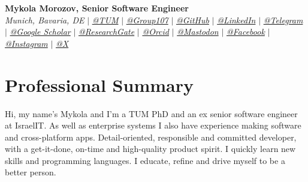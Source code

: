\documentclass[letterpaper,10pt]{article}
\newcommand{\sectionspace}{
\vspace{-20pt}
}
\begin{document}
	

\begin{flushleft}
    \textbf{\large Mykola Morozov, Senior Software Engineer} \\    
    \textit{Munich, Bavaria, DE} $|$ 
    \href{mailto:mykola.morozov@tum.de}{{\textit{@TUM}}} $|$
    \href{mailto:mykola@group107.com}{{\textit{@Group107}}} $|$
    \href{https://github.com/mcmikecreations}{{\textit{@GitHub}}} $|$
    \href{https://www.linkedin.com/in/mykola-mor}{{\textit{@LinkedIn}}} $|$
    \href{https://t.me/mcmikecreations}{{\textit{@Telegram}}} $|$
    \href{https://scholar.google.com/citations?user=MwdhZtkAAAAJ&hl=en}{{\textit{@Google Scholar}}} $|$
    \href{https://www.researchgate.net/profile/Mykola_Morozov3}{{\textit{@ResearchGate}}} $|$
    \href{https://orcid.org/0000-0002-5892-6936}{{\textit{@Orcid}}} $|$
    \href{https://mastodon.social/@mykolamor}{{\textit{@Mastodon}}} $|$
    \href{https://www.facebook.com/mykolamor}{{\textit{@Facebook}}} $|$
    \href{https://www.instagram.com/mykolamor}{{\textit{@Instagram}}} $|$
    \href{https://twitter.com/MykolaMor}{{\textit{@X}}}
    \vspace{-8pt}
\end{flushleft}
	

\section{Professional Summary}
\vspace{-3pt}
\begin{itemize}[leftmargin=0.15in, label={}]
    {\item{
     {Hi, my name's Mykola and I'm a TUM PhD and an ex senior software engineer at IsraelIT. As well as enterprise systems I also have experience making software and cross-platform apps. Detail-oriented, responsible and committed developer, with a get-it-done, on-time and high-quality product spirit. I quickly learn new skills and programming languages. I educate, refine and drive myself to be a better person.} \\      
    }}
 \end{itemize}
 \sectionspace
	
\end{document}
